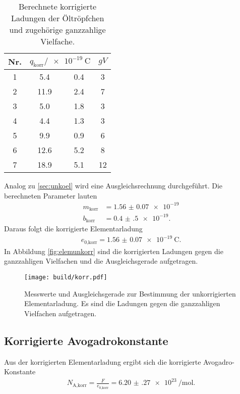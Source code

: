 \begin{table}[h]
  \centering
  \begin{tabular}{S S @{${}\pm{}$} S S}
    \toprule
    {Nr.} &  & {$gV$}\\
     & 5.4  & 0.4 & 3 \\
    2 & 11.9 & 2.4 & 7 \\
    3 & 5.0  & 1.8 & 3 \\
    4 & 4.4  & 1.3 & 3 \\
    5 & 9.9  & 0.9 & 6 \\
    6 & 12.6 & 5.2 & 8 \\
    7 & 18.9 & 5.1 & 12\\
    \bottomrule
  \end{tabular}
  \caption{Berechnete korrigierte Ladungen der Öltröpfchen und zugehörige
  ganzzahlige Vielfache.}
  \label{tab:Ladungenkorr}
\end{table}

\FloatBarrier

Analog zu \ref{sec:unkoel} wird eine Ausgleichsrechnung durchgeführt.
Die berechneten Parameter lauten
\begin{align}
  m_\text{korr} & = \num{1.56(7)e-19} \\
  b_\text{korr} & = \num{0.4(5)e-19}.
\end{align}
Daraus folgt die korrigierte Elementarladung
\begin{align}
  e_\text{0,korr} = \SI{1.56(7)e-19}{\coulomb}.
\end{align}
In Abbildung \ref{fig:elemunkorr} sind die korrigierten Ladungen gegen die ganzzahligen
Vielfachen und die Ausgleichsgerade aufgetragen.

\begin{figure}
  \centering
  \texttt{[image: build/korr.pdf]}
  \caption{Messwerte und Ausgleichsgerade zur Bestimmung der unkorrigierten Elementarladung.
  Es sind die Ladungen gegen die ganzzahligen Vielfachen aufgetragen.}
  \label{fig:elemkorr}
\end{figure}

\FloatBarrier

\subsection{Korrigierte Avogadrokonstante}

Aus der korrigierten Elementarladung ergibt sich die korrigierte Avogadro-Konstante
\begin{align}
  N_\text{A,korr} = \frac{F}{e_\text{0,korr}} = \SI{6.20(27)e23}{\per\mol}.
\end{align}
